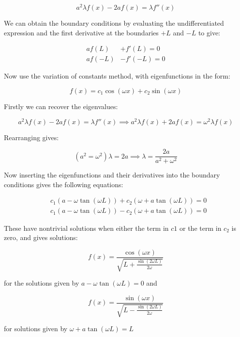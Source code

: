 \documentclass[11pt]{article} %
\begin{document}
\begin{equation}
	a^{2}\lambda f(x) - 2af(x) = \lambda f''(x)
\end{equation}

We can obtain the boundary conditions by evaluating the undifferentiated expression and the first derivative at the boundaries $+L$ and $-L$ to give:

\begin{align}
a f(L) &+ f'(L) = 0\\
a f(-L) &- f'(-L) = 0
\end{align}

Now use the variation of constants method, with eigenfunctions in the form:

\begin{equation}
f(x) = c_{1} \cos(\omega x) + c_{2} \sin(\omega x)
\end{equation}

Firstly we can recover the eigenvalues:

\begin{equation}
	a^{2}\lambda f(x) - 2af(x) = \lambda f''(x) \implies a^{2}\lambda f(x) + 2 a f(x) = \omega^{2}\lambda f(x)
\end{equation}

Rearranging gives:

\begin{equation}
	(a^{2} = \omega^{2})\lambda = 2a \implies \lambda = \frac{2a}{a^{2} + \omega^{2}}
\end{equation}

Now inserting the eigenfunctions and their derivatives into the boundary conditions gives the following equations:

\begin{align}
	&c_{1}(a - \omega \tan(\omega L)) + c_{2}(\omega + a \tan(\omega L)) = 0\\
	&c_{1}(a - \omega \tan(\omega L)) - c_{2}(\omega + a \tan(\omega L)) = 0
\end{align}

These have nontrivial solutions when either the term in $c{1}$ or the term in $c_{2}$ is zero, and gives solutions:

\begin{equation}
	f(x) = \frac{\cos(\omega x)}{\sqrt{L + \frac{\sin(2\omega L)}{2\omega}}}
\end{equation}

for the solutions given by $a - \omega \tan(\omega L) = 0$ and

\begin{equation}
	f(x) = \frac{\sin(\omega x)}{\sqrt{L - \frac{\sin(2\omega L)}{2\omega}}}
\end{equation}

for solutions given by $\omega + a \tan(\omega L) = L$
\end{document}
